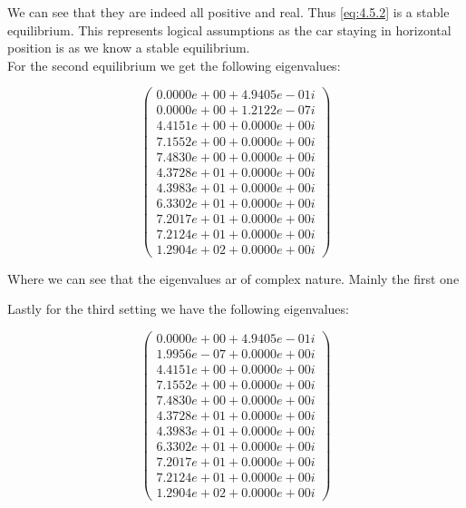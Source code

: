 We can see that they are indeed all positive and real. Thus \ref{eq:4.5.2} is a stable equilibrium. This represents logical assumptions as the car staying in horizontal position is as we know a stable equilibrium.\vspace{3mm}\\

For the second equilibrium we get the following eigenvalues:

\begin{equation}
    \begin{pmatrix}
        0.0000e+00 + 4.9405e-01i\\
        0.0000e+00 + 1.2122e-07i\\
        4.4151e+00 + 0.0000e+00i\\
        7.1552e+00 + 0.0000e+00i\\
        7.4830e+00 + 0.0000e+00i\\
        4.3728e+01 + 0.0000e+00i\\
        4.3983e+01 + 0.0000e+00i\\
        6.3302e+01 + 0.0000e+00i\\
        7.2017e+01 + 0.0000e+00i\\
        7.2124e+01 + 0.0000e+00i\\
        1.2904e+02 + 0.0000e+00i
    \end{pmatrix}
\end{equation}

Where we can see that the eigenvalues ar of complex nature. Mainly the first one

Lastly for the third setting we have the following eigenvalues:

\begin{equation}
    \begin{pmatrix}
        0.0000e+00 + 4.9405e-01i\\
        1.9956e-07 + 0.0000e+00i\\
        4.4151e+00 + 0.0000e+00i\\
        7.1552e+00 + 0.0000e+00i\\
        7.4830e+00 + 0.0000e+00i\\
        4.3728e+01 + 0.0000e+00i\\
        4.3983e+01 + 0.0000e+00i\\
        6.3302e+01 + 0.0000e+00i\\
        7.2017e+01 + 0.0000e+00i\\
        7.2124e+01 + 0.0000e+00i\\
        1.2904e+02 + 0.0000e+00i
    \end{pmatrix}
\end{equation}

